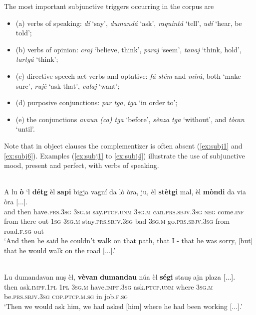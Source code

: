 The most important subjunctive triggers occurring in the corpus are

\begin{itemize}
\item (a) verbs of speaking: \textit{dí} `say', \textit{dumandá} `ask', \textit{raquintá} `tell', \textit{udí} `hear, be told';
\item (b) verbs of opinion: \textit{craj} `believe, think', \textit{paraj} `seem', \textit{tanaj} `think, hold', \textit{tartgá} `think';
\item (c) directive speech act verbs and optative: \textit{fá stém} and \textit{mirá}, both `make sure', \textit{rujè} `ask that', \textit{vulaj} `want';
\item (d) purposive conjunctions: \textit{par tga}, \textit{tga} `in order to';
\item (e) the conjunctions \textit{avaun (ca) tga} `before', \textit{sènza tga} `without', and \textit{tòcan} `until'.
\end{itemize}

Note that in object clauses the complementizer is often absent (\ref{ex:subj1} and \ref{ex:subj6}). Examples (\ref{ex:subj1} to \ref{ex:subj4}) illustrate the use of subjunctive mood, present and perfect, with verbs of speaking.

\ea
\label{ex:subj1}
\\
\gll  A lu \textbf{ò} `l \textbf{détg} {\longrule} èl \textbf{sapi} bigja vagní da lò òra, ju, èl {\longrule} \textbf{stètgi} mal, èl {\longrule} \textbf{mòndi} da via òra [...].  \\
and then have.\textsc{prs.3sg} \textsc{3sg.m} say.\textsc{ptcp.unm} {} \textsc{3sg.m} can.\textsc{prs.sbjv.3sg} \textsc{neg} come.\textsc{inf} from there out \textsc{1sg} \textsc{3sg.m} {} stay.\textsc{prs.sbjv.3sg} bad \textsc{3sg.m} {} go.\textsc{prs.sbjv.3sg} from road.\textsc{f.sg} out\\
\glt `And then he said he couldn’t walk on that path, that I - that he was sorry, [but] that he would walk on the road [...].'
\z

\ea
\label{ex:subj2}
\\
\gll Lu dumandavan nuṣ èl, \textbf{vèvan} \textbf{dumandau} núa èl \textbf{ségi} stauṣ ajn plaza [...].\\
then ask.\textsc{impf.1pl} \textsc{1pl} \textsc{3sg.m} have.\textsc{impf.3sg}  ask.\textsc{ptcp.unm} where \textsc{3sg.m} be.\textsc{prs.sbjv.3sg} \textsc{cop.ptcp.m.sg} in job.\textsc{f.sg}\\
\glt `Then we would ask him, we had asked [him] where he had been working [...].'
\z

